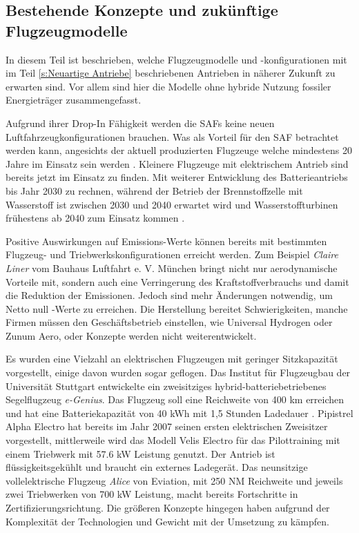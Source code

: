 \subsection{Bestehende Konzepte und zukünftige Flugzeugmodelle}
In diesem Teil ist beschrieben, welche Flugzeugmodelle und -konfigurationen 
mit im Teil \ref{s:Neuartige Antriebe} beschriebenen Antrieben in näherer Zukunft zu erwarten sind. 
Vor allem sind hier die Modelle ohne hybride Nutzung fossiler Energieträger zusammengefasst.

Aufgrund ihrer Drop-In Fähigkeit werden die SAFs keine neuen Luftfahrzeugkonfigurationen brauchen. 
Was als Vorteil für den SAF betrachtet werden kann, 
angesichts der aktuell produzierten Flugzeuge welche
mindestens 20 Jahre im Einsatz sein werden \cite{austr}.  
Kleinere Flugzeuge mit elektrischem Antrieb sind bereits jetzt im Einsatz zu finden. 
Mit weiterer Entwicklung des Batterieantriebs bis Jahr 2030 zu rechnen, 
während der Betrieb der Brennstoffzelle mit Wasserstoff ist zwischen 2030 und 2040 erwartet wird
und Wasserstoffturbinen frühestens ab 2040 zum Einsatz kommen \cite{austr}. 

%
Positive Auswirkungen auf Emissions-Werte können bereits mit bestimmten 
Flugzeug- und Triebwerkskonfigurationen erreicht werden.
Zum Beispiel \textit{Claire Liner} vom Bauhaus Luftfahrt e. V. München 
bringt nicht nur aerodynamische Vorteile mit, sondern auch eine Verringerung 
des Kraftstoffverbrauchs und damit die Reduktion der Emissionen.
Jedoch sind mehr Änderungen notwendig, um Netto null -Werte zu erreichen.
Die Herstellung bereitet Schwierigkeiten, manche Firmen müssen den Geschäftsbetrieb einstellen, 
wie Universal Hydrogen oder Zunum Aero, oder Konzepte werden nicht weiterentwickelt.

Es wurden eine Vielzahl an elektrischen Flugzeugen mit geringer 
Sitzkapazität vorgestellt, einige davon wurden sogar geflogen.
Das Institut für Flugzeugbau der Universität Stuttgart entwickelte 
ein zweisitziges hybrid-batteriebetriebenes Segelflugzeug \textit{e-Genius}. 
Das Flugzeug soll eine Reichweite von 400 km erreichen und hat eine 
Batteriekapazität von 40 kWh mit 1,5 Stunden Ladedauer \cite{IFB_eGenius_2025}.
Pipistrel Alpha Electro hat bereits im Jahr 2007 seinen ersten elektrischen Zweisitzer vorgestellt, 
mittlerweile wird das Modell \glqq Velis Electro\grqq{} \cite{Pipistrel_VelisElectro} für 
das Pilottraining mit einem Triebwerk mit 57.6 kW Leistung genutzt. 
Der Antrieb ist flüssigkeitsgekühlt und braucht ein externes Ladegerät. 
Das neunsitzige vollelektrische Flugzeug \textit{Alice} von Eviation, 
mit 250 NM Reichweite und jeweils zwei Triebwerken von 700 kW Leistung,
macht bereits Fortschritte in Zertifizierungsrichtung.
%
Die größeren Konzepte hingegen haben aufgrund der Komplexität der Technologien 
und Gewicht mit der Umsetzung zu kämpfen.\\

